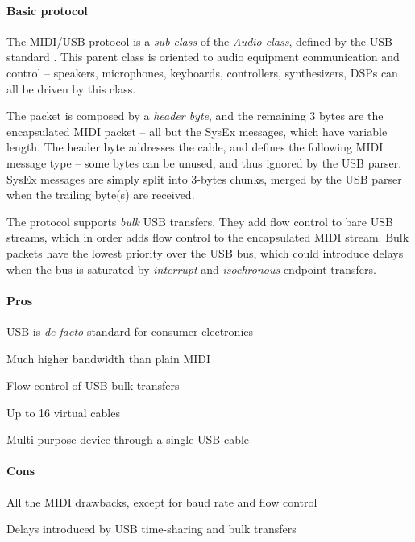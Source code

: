 \documentclass[a4paper,10pt]{article}
\begin{document}
\begin{multicols}{2}
\paragraph{Basic protocol}
The MIDI/USB protocol is a \emph{sub-class} of the \emph{Audio class}, defined
by the USB standard \cite{usb_docs}. This parent class is oriented to audio
equipment communication and control -- speakers, microphones, keyboards,
controllers, synthesizers, DSPs can all be driven by this class.

The packet is composed by a \emph{header byte}, and the remaining 3 bytes are
the encapsulated MIDI packet -- all but the SysEx messages, which have variable
length. The header byte addresses the cable, and defines the following MIDI
message type -- some bytes can be unused, and thus ignored by the USB parser.
SysEx messages are simply split into 3-bytes chunks, merged by the USB parser
when the trailing byte(s) are received.

The protocol supports \emph{bulk} USB transfers. They add flow control to bare
USB streams, which in order adds flow control to the encapsulated MIDI stream.
Bulk packets have the lowest priority over the USB bus, which could introduce
delays when the bus is saturated by \emph{interrupt} and \emph{isochronous}
endpoint transfers.


\paragraph{Pros}
\begin{itemize*}
	\item USB is \emph{de-facto} standard for consumer electronics
	\item Much higher bandwidth than plain MIDI
	\item Flow control of USB bulk transfers
	\item Up to 16 virtual cables
	\item Multi-purpose device through a single USB cable
\end{itemize*}


\paragraph{Cons}
\begin{itemize*}
	\item All the MIDI drawbacks, except for baud rate and flow control
	\item Delays introduced by USB time-sharing and bulk transfers
\end{itemize*}



\end{multicols}
\end{document}
